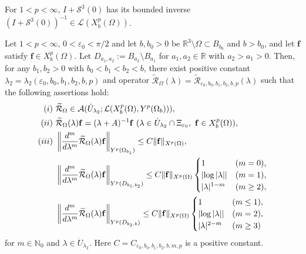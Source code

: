 \documentclass[10pt,a4paper]{amsart}
\begin{document}
\begin{lem}\label{R-Ex-lem1}
For $1<p<\infty$, $I+\mathcal{S}^3(0)$ has its bounded inverse $(I+\mathcal{S}^3(0))^{-1}\in \mathcal{L}(X_b^p(\Omega))$.
\end{lem}

\begin{prop}\label{R-Ex-Prop2}
Let $1<p<\infty$, $0<\varepsilon_0<\pi/2$ and let $b, b_0>0$ be $\mathbb{R}^3 \setminus \Omega \subset B_{b_0}$ and $b>b_0$, and let $\mathbf{f}$ satisfy $\mathbf{f}\in X_b^p(\Omega)$. Let $D_{a_1,a_2}:=B_{a_2}\setminus B_{a_1}$ for $a_1,a_2\in \mathbb{R}$ with $a_2>a_1>0$.
Then, for any $b_1,b_2>0$ with $b_0<b_1<b_2<b$, there exist positive constant $\lambda_2=\lambda_2(\varepsilon_0,b_0,b_1,b_2,b,p)$ and operator $\widetilde{\mathcal{R}}_\Omega (\lambda)=\widetilde{\mathcal{R}}_{\varepsilon_0,b_0,b_1,b_2,b,p} (\lambda)$ such that the following assertions hold:
\begin{align}
{\rm (i)}~ &\widetilde{\mathcal{R}}_\Omega\in\mathcal{A}(\Dot{U}_{\lambda_2}; \mathcal{L}(X_b^p(\Omega),Y^p(\Omega_b))), \label{R-Ex-Prop2-1} \\
{\rm (ii)}~ &\widetilde{\mathcal{R}}_\Omega(\lambda)\mathbf{f}=(\lambda+A)^{-1}\mathbf{f}~(\lambda\in \Dot{U}_{\lambda_2}\cap \Xi_{\varepsilon_0},~\mathbf{f}\in X_b^p(\Omega) ), \label{R-Ex-Prop2-2} \\
{\rm (iii)}~
&\left\| \frac{d^m}{d\lambda^m}\widetilde{\mathcal{R}}_\Omega (\lambda)\mathbf{f}\right\|_{Y^p(\Omega_{b_1})} 
\le C\|\mathbf{f}\|_{X^p(\Omega)},
\label{R-Ex-Prop2-3} \\
&\left\| \frac{d^m}{d\lambda^m}\widetilde{\mathcal{R}}_\Omega (\lambda)\mathbf{f}\right\|_{Y^p( D_{b_1,b_2})} 
\le C\|\mathbf{f}\|_{X^p(\Omega)}
\begin{cases}
1 & (m=0), \\
\left|\log |\lambda|\right| & (m=1), \\
|\lambda|^{1-m} &(m\ge2),
\end{cases}  \label{R-Ex-Prop2-4} \\
&\left\| \frac{d^m}{d\lambda^m}\widetilde{\mathcal{R}}_\Omega (\lambda)\mathbf{f}\right\|_{Y^p(D_{b_2,b})} 
\le C\|\mathbf{f}\|_{X^p(\Omega)}
\begin{cases}
1 & (m\le1), \\
\left|\log |\lambda|\right| & (m=2), \\
|\lambda|^{2-m} &(m\ge3)
\end{cases}  \label{R-Ex-Prop2-5}
\end{align}
for $m\in\mathbb{N}_0$ and $\lambda\in \Dot{U}_{\lambda_2}$. 
Here $C=C_{\varepsilon_0,b_0,b_1,b_2,b,m,p}$ is a positive constant. 
\end{prop}
\end{document}
